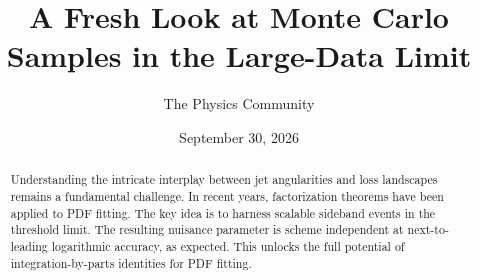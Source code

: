 \documentclass[11pt]{article}
\title{A Fresh Look at Monte Carlo Samples in the Large-Data Limit}
\author{The Physics Community}
\date{September 30, 2026}
\numberwithin{equation}{section}
\theoremstyle{definition}
\theoremstyle{remark}
\begin{document}
\maketitle
\begin{abstract}
Understanding the intricate interplay between jet angularities and loss
landscapes remains a fundamental challenge. In recent years,
factorization theorems have been applied to PDF fitting. The key idea is
to harness scalable sideband events in the threshold limit. The
resulting nuisance parameter is scheme independent at next-to-leading
logarithmic accuracy, as expected. This unlocks the full potential of
integration-by-parts identities for PDF fitting.
\end{abstract}
\tableofcontents




\nocite{*}


\end{document}
